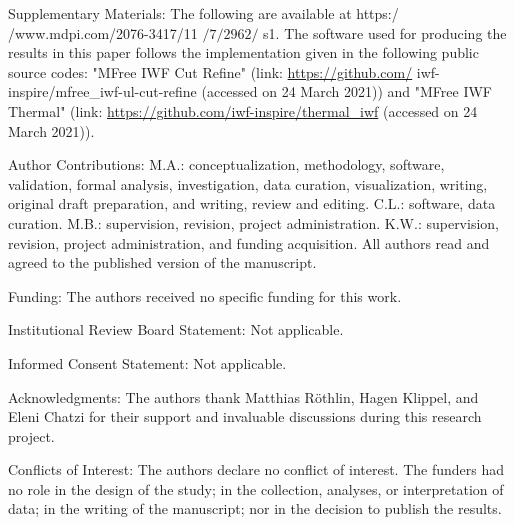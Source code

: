 \documentclass[10pt]{article}
\begin{document}
Supplementary Materials: The following are available at https:/ /www.mdpi.com/2076-3417/11 $/ 7 / 2962 /$ s1. The software used for producing the results in this paper follows the implementation given in the following public source codes: "MFree IWF Cut Refine" (link: \href{https://github.com/}{https://github.com/} iwf-inspire/mfree\_iwf-ul-cut-refine (accessed on 24 March 2021)) and "MFree IWF Thermal" (link: \href{https://github.com/iwf-inspire/thermal_iwf}{https://github.com/iwf-inspire/thermal\_iwf} (accessed on 24 March 2021)).

Author Contributions: M.A.: conceptualization, methodology, software, validation, formal analysis, investigation, data curation, visualization, writing, original draft preparation, and writing, review and editing. C.L.: software, data curation. M.B.: supervision, revision, project administration. K.W.: supervision, revision, project administration, and funding acquisition. All authors read and agreed to the published version of the manuscript.

Funding: The authors received no specific funding for this work.

Institutional Review Board Statement: Not applicable.

Informed Consent Statement: Not applicable.

Acknowledgments: The authors thank Matthias Röthlin, Hagen Klippel, and Eleni Chatzi for their support and invaluable discussions during this research project.

Conflicts of Interest: The authors declare no conflict of interest. The funders had no role in the design of the study; in the collection, analyses, or interpretation of data; in the writing of the manuscript; nor in the decision to publish the results.
\end{document}
